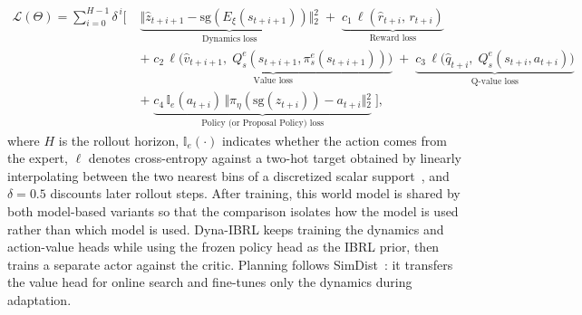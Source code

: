 \documentclass{article} %
\begin{document}
\begin{equation}
\begin{aligned}
\mathcal{L}(\Theta) = \sum_{i=0}^{H-1} \delta^{\,i} \Big[\;
&\underbrace{\Vert{}\hat{z}_{t+i+1} - \text{sg}(E_\xi(s_{t+i+1}))\Vert{}_2^2}_{\text{Dynamics loss}}
\;+\; \underbrace{c_1\, \ell(\hat{r}_{t+i},\, r_{t+i})}_{\text{Reward loss}} \\[3pt]
&+\; \underbrace{c_2\, \ell\big(\hat{v}_{t+i+1},\; Q^{e}_{s}(s_{t+i+1},\pi_s^e(s_{t+i+1}))\big)}_{\text{Value loss}}
\;+\; \underbrace{c_3\, \ell\big(\hat{q}_{t+i},\; Q^{e}_{s}(s_{t+i},a_{t+i})\big)}_{\text{Q-value loss}}\\[3pt]
&+\; \underbrace{c_4\, \mathbb{I}_e(a_{t+i})\, \Vert{}\pi_\eta(\text{sg}(z_{t+i})) - a_{t+i}\Vert{}_2^2}_{\text{Policy (or Proposal Policy) loss}} 
\;\Big],
\end{aligned}
\label{eq:simdist-distill}
\end{equation}
where $H$ is the rollout horizon, $\mathbb{I}_e(\cdot)$ indicates whether the action comes from the expert, $\ell$ denotes cross-entropy against a two-hot target obtained by linearly interpolating between the two nearest bins of a discretized scalar support~\citep{hansen2024td}, and $\delta=0.5$ discounts later rollout steps. After training, this world model is shared by both model-based variants so that the comparison isolates how the model is used rather than which model is used. Dyna-IBRL keeps training the dynamics and action-value heads while using the frozen policy head as the IBRL prior, then trains a separate actor against the critic. Planning follows SimDist~\citep{levy2026simulation}: it transfers the value head for online search and fine-tunes only the dynamics during adaptation.
\end{document}
